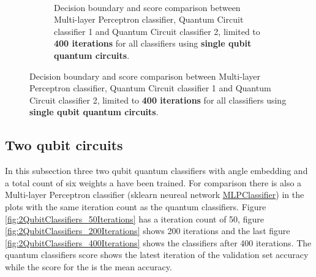 \begin{figure}[h!]
\begin{subfigure}{1.0\textwidth}
    \end{subfigure}
    \\[2ex]
    \begin{subfigure}{1.0\textwidth}
        \centering
        \caption{Decision boundary and score comparison between Multi-layer Perceptron classifier, Quantum Circuit classifier 1 and Quantum Circuit classifier 2, limited to \textbf{400 iterations} for all classifiers using \textbf{single qubit quantum circuits}.}
        \label{fig:SingleQubitClassifiers_400Iterations}
    \end{subfigure}
    
\end{figure}

\clearpage
\subsection{Two qubit circuits}
\label{subsection:two_qubit_circuits}

In this subsection three two qubit quantum classifiers with angle embedding and a total count of six weights a have been trained. For comparison there is also a Multi-layer Perceptron classifier (sklearn neureal network \href{https://scikit-learn.org/stable/modules/generated/sklearn.neural_network.MLPClassifier.html}{MLPClassifier}) in the plots with the same iteration count as the quantum classifiers. Figure \ref{fig:2QubitClassifiers_50Iterations} has a iteration count of 50, figure \ref{fig:2QubitClassifiers_200Iterations} shows 200 iterations and the last figure \ref{fig:2QubitClassifiers_400Iterations} shows the classifiers after 400 iterations. The quantum classifiers score shows the latest iteration of the validation set accuracy while the score for the  is the mean accuracy.\\
\\

